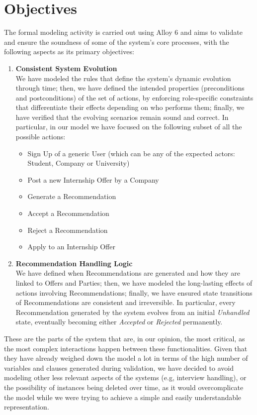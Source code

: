 \section{Objectives}
\label{subsec:objectives_formal_modeling_activity}%

The formal modeling activity is carried out using Alloy 6 and aims to validate and ensure the soundness of some of the system’s core processes, with the following aspects as its primary objectives:

\begin{enumerate}

\item \textbf{Consistent System Evolution} \\
We have modeled the rules that define the system's dynamic evolution through time; then, we have defined the intended properties (preconditions and postconditions) of the set of actions, by enforcing role-specific constraints that differentiate their effects depending on who performs them; finally, we have verified that the evolving scenarios remain sound and correct. In particular, in our model we have focused on the following subset of all the possible actions:
\begin{itemize}
 \item Sign Up of a generic User (which can be any of the expected actors: Student, Company or University)
 \item Post a new Internship Offer by a Company
 \item Generate a Recommendation
 \item Accept a Recommendation
 \item Reject a Recommendation
 \item Apply to an Internship Offer
\end{itemize}

\item \textbf{Recommendation Handling Logic} \\
We have defined when Recommendations are generated and how they are linked to Offers and Parties; then, we have modeled the long-lasting effects of actions involving Recommendations; finally, we have ensured state transitions of Recommendations are consistent and irreversible. In particular, every Recommendation generated by the system evolves from an initial \textit{Unhandled} state, eventually becoming either \textit{Accepted} or \textit{Rejected} permanently. 
\end{enumerate}

These are the parts of the system that are, in our opinion, the most critical, as the most complex interactions happen between these functionalities. Given that they have already weighed down the model a lot in terms of the high number of variables and clauses generated during validation, we have decided to avoid modeling other less relevant aspects of the systems (e.g, interview handling), or the possibility of instances being deleted over time, as it would overcomplicate the model while we were trying to achieve a simple and easily understandable representation.

